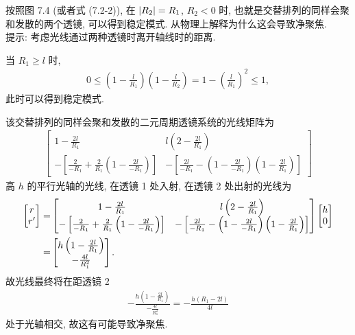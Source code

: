 \documentclass{note}
\begin{document}
\begin{exe}
    按照图 7.4 (或者式 (7.2-2)), 在 $\left\lvert R_2\right\rvert=R_1$, $R_2<0$ 时, 也就是交替排列的同样会聚和发散的两个透镜, 可以得到稳定模式. 从物理上解释为什么这会导致净聚焦.\\
    提示: 考虑光线通过两种透镜时离开轴线时的距离.
\end{exe}
\begin{sol}
    当 $R_1\geq l$ 时,
    \begin{align}
        0\leq\left(1-\frac{l}{R_1}\right)\left(1-\frac{l}{R_2}\right)=1-\left(\frac{l}{R_1}\right)^2\leq 1,
    \end{align}
    此时可以得到稳定模式.

    该交替排列的同样会聚和发散的二元周期透镜系统的光线矩阵为
    \begin{align}
        \begin{bmatrix}
            1-\frac{2l}{R_1}&l\left(2-\frac{2l}{R_1}\right)\\
            -\left[\frac{2}{-R_1}+\frac{2}{R_1}\left(1-\frac{2l}{-R_1}\right)\right]&-\left[\frac{2l}{-R_1}-\left(1-\frac{2l}{-R_1}\right)\left(1-\frac{2l}{R_1}\right)\right]
        \end{bmatrix}
    \end{align}
    高 $h$ 的平行光轴的光线, 在透镜 1 处入射, 在透镜 2 处出射的光线为
    \begin{align}
        \notag\begin{bmatrix}
            r\\
            r'
        \end{bmatrix}=&\begin{bmatrix}
            1-\frac{2l}{R_1}&l\left(2-\frac{2l}{R_1}\right)\\
            -\left[\frac{2}{-R_1}+\frac{2}{R_1}\left(1-\frac{2l}{-R_1}\right)\right]&-\left[\frac{2l}{-R_1}-\left(1-\frac{2l}{-R_1}\right)\left(1-\frac{2l}{R_1}\right)\right]
        \end{bmatrix}\begin{bmatrix}
            h\\
            0
        \end{bmatrix}\\
        =&\begin{bmatrix}
            h\left(1-\frac{2l}{R_1}\right)\\
            -\frac{4l}{R_1^2}
        \end{bmatrix}.
    \end{align}
    故光线最终将在距透镜 2
    \begin{align}
        -\frac{h\left(1-\frac{2l}{R_1}\right)}{-\frac{4l}{R_1^2}}=-\frac{h(R_1-2l)}{4l}
    \end{align}
    处于光轴相交, 故这有可能导致净聚焦.
\end{sol}
\end{document}
